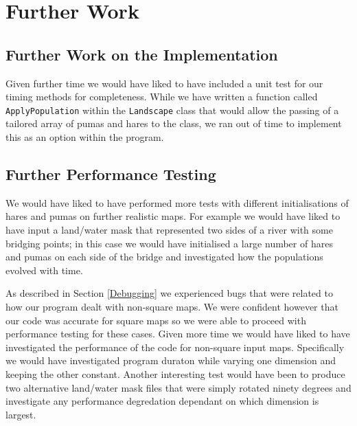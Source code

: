 \section{Further Work}
\label{Further Work}

\subsection{Further Work on the Implementation}
Given further time we would have liked to have included a unit test for our timing methods for completeness.
While we have written a function called \texttt{ApplyPopulation} within the \texttt{Landscape} class that would allow the passing of a tailored array of pumas and hares to the class, we ran out of time to implement this as an option within the program. 

\subsection{Further Performance Testing}

We would have liked to have performed more tests with different initialisations of hares and pumas on further realistic maps. For example we would have liked to have input a land/water mask that represented two sides of a river with some bridging points; in this case we would have initialised a large number of hares and pumas on each side of the bridge and investigated how the populations evolved with time.   

As described in Section \ref{Debugging} we experienced bugs that were related to how our program dealt with non-square maps. We were confident however that our code was accurate for square maps so we were able to proceed with performance testing for these cases. 
Given more time we would have liked to have investigated the performance of the code for non-square input maps.
Specifically we would have investigated program duraton while varying one dimension and keeping the other constant. Another interesting test would have been to produce two alternative land/water mask files that were simply rotated ninety degrees and investigate any performance degredation dependant on which dimension is largest. 



 
